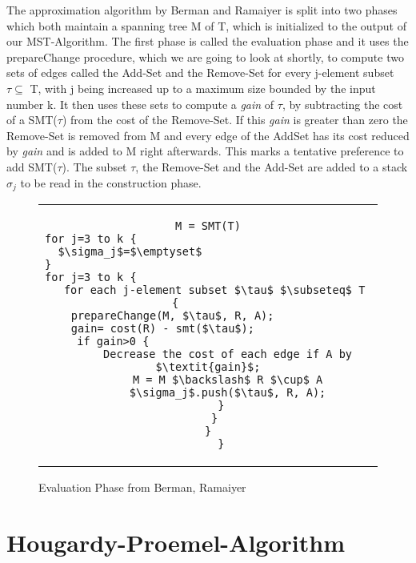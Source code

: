 The approximation algorithm by Berman and Ramaiyer is split into two phases which both maintain a spanning tree M of T, which is initialized to the output of our MST-Algorithm. The first phase is called the evaluation phase and it uses the prepareChange procedure, which we are going to look at shortly, to compute two sets of edges called the Add-Set and the Remove-Set for every j-element subset $\tau \subseteq$ T, with j being increased up to a maximum size bounded by the input number k. It then uses these sets to compute a \textit{gain} of $\tau$, by subtracting the cost of a SMT($\tau$) from the cost of the Remove-Set. If this \textit{gain} is greater than zero the Remove-Set is removed from M and every edge of the AddSet has its cost reduced by \textit{gain} and is added to M right afterwards. This marks a tentative preference to add SMT($\tau$). The subset $\tau$, the Remove-Set and the Add-Set are added to a stack $\sigma_j$ to be read in the construction phase.
\begin{figure}[htbp]
  \centering
  \begin{tabular}{c}
  \begin{lstlisting}[mathescape]
M = SMT(T)
for j=3 to k {											
  $\sigma_j$=$\emptyset$								
}													
for j=3 to k {											
  for each j-element subset $\tau$ $\subseteq$ T {			
    prepareChange(M, $\tau$, R, A);						
    gain= cost(R) - smt($\tau$);					
    if gain>0 {									
      Decrease the cost of each edge if A by $\textit{gain}$;
      M = M $\backslash$ R $\cup$ A
      $\sigma_j$.push($\tau$, R, A);
    }
  }
}
    }
  \end{lstlisting}
  \end{tabular}
  \caption[evaluation]{Evaluation Phase from Berman, Ramaiyer \cite{BeRa94}}\label{fig:evaPseudo}
\end{figure}

\section{Hougardy-Proemel-Algorithm}


